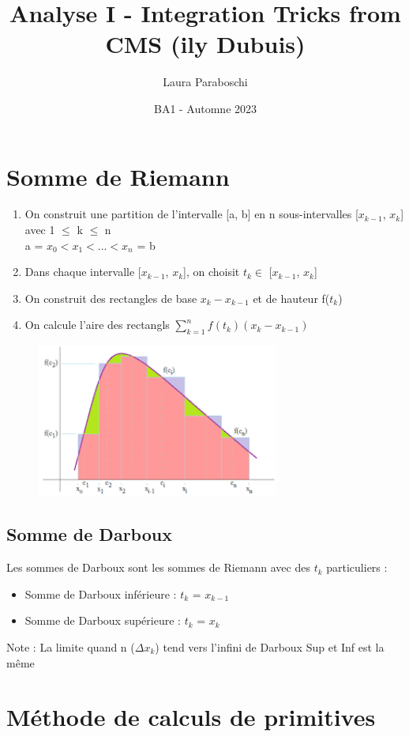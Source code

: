 \documentclass{article}
\title{Analyse I - Integration Tricks from CMS (ily Dubuis)}
\author{Laura Paraboschi}
\date{BA1 - Automne 2023}
\begin{document}
\maketitle

\section{Somme de Riemann}
\begin{enumerate}
    \item On construit une partition de l'intervalle [a, b] en n sous-intervalles [$x_{k-1}$, $x_k$] avec 1 $\leq$ k $\leq$ n \\
    a = $x_0 < x_1 < $...$ < x_n$ = b
    \item Dans chaque intervalle [$x_{k-1}$, $x_k$], on choisit $t_k \in$ [$x_{k-1}$, $x_k$]
    \item On construit des rectangles de base $x_k - x_{k-1}$ et de hauteur f($t_k$)
    \item On calcule l'aire des rectangls $\sum_{k = 1}^{n} f(t_k)(x_k - x_{k-1})$
\end{enumerate}
\begin{figure}[htp]
    \centering
    \includegraphics[width=8cm]{Images/riemann.png}
    \label{fig:enter-label}
\end{figure}
\subsection{Somme de Darboux}
Les sommes de Darboux sont les sommes de Riemann avec des $t_k$ particuliers :
\begin{itemize}
    \item Somme de Darboux inférieure : $t_k$ = $x_{k-1}$
    \item Somme de Darboux supérieure : $t_k$ = $x_{k}$
\end{itemize}
Note : La limite quand n ($\Delta x_k$) tend vers l'infini de Darboux Sup et Inf est la même

\section{Méthode de calculs de primitives}
\end{document}
